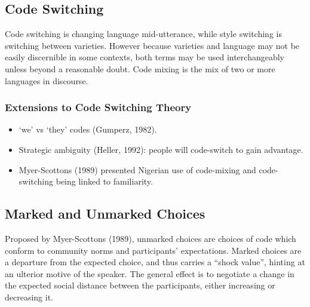 \documentclass[../main.tex]{subfiles}
\begin{document}
    \subsection{Code Switching}
    Code switching is changing language mid-utterance, while style switching is switching between varieties. However because varieties and language may not be easily discernible in some contexts, both terms may be used interchangeably unless beyond a reasonable doubt. Code mixing is the mix of two or more languages in discourse. 

    \subsubsection{Extensions to Code Switching Theory}
    \begin{itemize}
        \item `we' vs `they' codes (Gumperz, 1982).
        \item Strategic ambiguity (Heller, 1992): people will code-switch to gain advantage.
        \item Myer-Scottons (1989) presented Nigerian use of code-mixing and code-switching being linked to familiarity.
    \end{itemize}

    \subsection{Marked and Unmarked Choices}
    Proposed by Myer-Scottons (1989), unmarked choices are choices of code which conform to community norms and participants' expectations. Marked choices are a departure from the expected choice, and thus carries a ``shock value'', hinting at an ulterior motive of the speaker. The general effect is to negotiate a change in the expected social distance between the participants, either increasing or decreasing it. 
\end{document}
